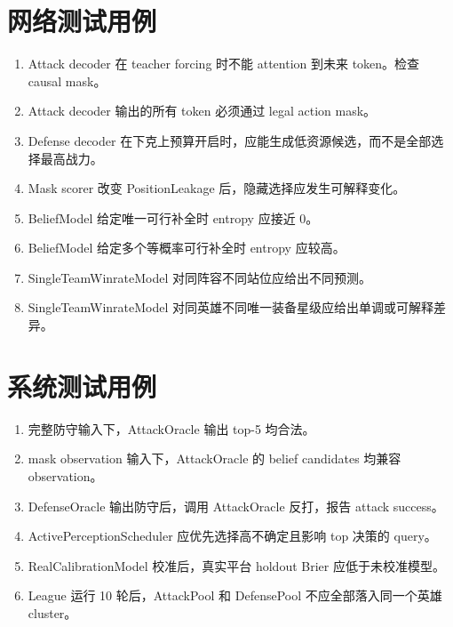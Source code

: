 \documentclass[UTF8,12pt,openany]{ctexbook}
\begin{document}
\section{网络测试用例}
\begin{enumerate}[leftmargin=2em]
\item Attack decoder 在 teacher forcing 时不能 attention 到未来 token。检查 causal mask。\\
\item Attack decoder 输出的所有 token 必须通过 legal action mask。\\
\item Defense decoder 在下克上预算开启时，应能生成低资源候选，而不是全部选择最高战力。\\
\item Mask scorer 改变 PositionLeakage 后，隐藏选择应发生可解释变化。\\
\item BeliefModel 给定唯一可行补全时 entropy 应接近 0。\\
\item BeliefModel 给定多个等概率可行补全时 entropy 应较高。\\
\item SingleTeamWinrateModel 对同阵容不同站位应给出不同预测。\\
\item SingleTeamWinrateModel 对同英雄不同唯一装备星级应给出单调或可解释差异。\\
\end{enumerate}

\section{系统测试用例}
\begin{enumerate}[leftmargin=2em]
\item 完整防守输入下，AttackOracle 输出 top-5 均合法。\\
\item mask observation 输入下，AttackOracle 的 belief candidates 均兼容 observation。\\
\item DefenseOracle 输出防守后，调用 AttackOracle 反打，报告 attack success。\\
\item ActivePerceptionScheduler 应优先选择高不确定且影响 top 决策的 query。\\
\item RealCalibrationModel 校准后，真实平台 holdout Brier 应低于未校准模型。\\
\item League 运行 10 轮后，AttackPool 和 DefensePool 不应全部落入同一个英雄 cluster。\\
\end{enumerate}
\end{document}
